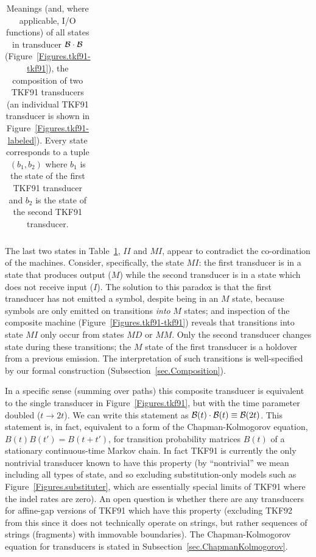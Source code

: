\documentclass{article}
\newcommand{\secref}[1]{Subsection~\ref{sec.#1}}
\newcommand{\tabnum}[1]{\ref{tab.#1}}
\newcommand{\tabref}[1]{Table~\tabnum{#1}}
\newcommand{\tablabel}[1]{\label{tab.#1}}
\newcommand{\figref}[1]{Figure~\ref{Figures.#1}}
\newcommand\tkf{{\cal B}}
\begin{document}
\begin{table}
\begin{tabular}{c|p{}|p{}}
\end{tabular}
\caption{ \tablabel{tkf91-tkf91} Meanings (and, where applicable, I/O functions) of all states in
transducer $\tkf \cdot \tkf$ (\figref{tkf91-tkf91}),
the composition of two TKF91 transducers
(an individual TKF91 transducer is shown in \figref{tkf91-labeled}).
Every state corresponds to a tuple $(b_1,b_2)$
where
$b_1$ is the state of the first TKF91 transducer and
$b_2$ is the state of the second TKF91 transducer.
 }
\end{table}

The last two states in \tabref{tkf91-tkf91}, $II$ and $MI$, appear to contradict the co-ordination of the machines.
Consider, specifically, the state $MI$:
the first transducer is in a state that produces output ($M$)
while the second transducer is in a state which does not receive input ($I$).
The solution to this paradox is that the first transducer has not emitted a symbol, despite being in an $M$ state,
because symbols are only emitted on transitions {\em into} $M$ states;
and inspection of the composite machine (\figref{tkf91-tkf91}) reveals that transitions into state $MI$ only occur from states $MD$ or $MM$.
Only the second transducer changes state during these transitions; the $M$ state of the first transducer is a holdover from a previous emission.
The interpretation of such transitions is well-specified by our formal construction (\secref{Composition}).

In a specific sense (summing over paths)
this composite transducer is equivalent to the single transducer in \figref{tkf91},
but with the time parameter doubled ($t \to 2t$).
We can write this statement as $\tkf(t) \cdot \tkf(t) \equiv \tkf(2t)$.
This statement is, in fact, equivalent to a form of the Chapman-Kolmogorov equation,
$B(t)B(t') = B(t+t')$,
for transition probability matrices $B(t)$ of a stationary continuous-time Markov chain.
In fact TKF91 is currently the only nontrivial transducer known to have this property
(by ``nontrivial'' we mean including all types of state, and so excluding substitution-only models such as \figref{substituter},
which are essentially special limits of TKF91 where the indel rates are zero).
An open question is whether there are any transducers for affine-gap versions of TKF91 which
have this property
(excluding TKF92 from this since it does not technically operate on strings, but rather
sequences of strings (fragments) with immovable boundaries).  
The Chapman-Kolmogorov equation for transducers
is stated in \secref{ChapmanKolmogorov}.
\end{document}
